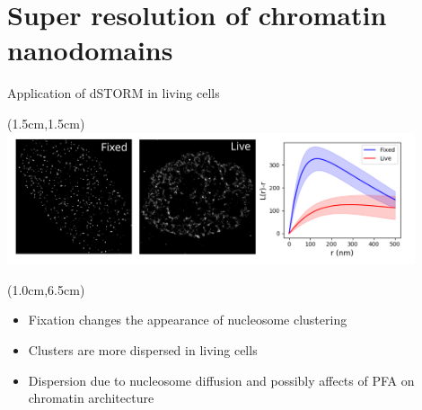 \documentclass{beamer}					%
\begin{document}
\section{Super resolution of chromatin nanodomains}

\begin{frame}{Application of dSTORM in living cells}
\begin{textblock*}{12cm}(1.5cm,1.5cm)
\includegraphics[width=12cm]{LiveFix}
\end{textblock*}
\begin{textblock*}{12cm}(1.0cm,6.5cm)
\begin{itemize}
\item Fixation changes the appearance of nucleosome clustering 
\item Clusters are more dispersed in living cells
\item Dispersion due to nucleosome diffusion and possibly affects of PFA on chromatin architecture
\end{itemize}
\end{textblock*}

\end{frame}
\end{document}
